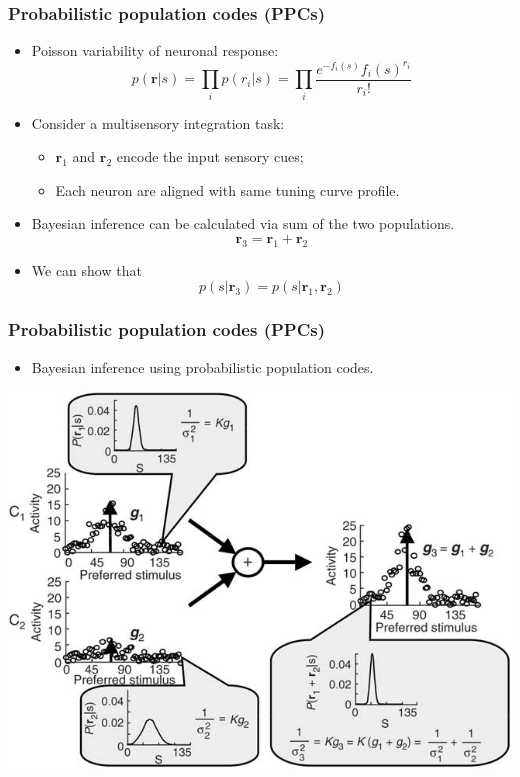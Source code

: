 \documentclass{beamer}
\begin{document}
\begin{frame}
  \frametitle{Probabilistic population codes (PPCs)}
  \begin{itemize}
    \item Poisson variability of neuronal response:
\begin{equation}
  p(\mathbf{r}|s) = \prod_{i} p(r_i|s) = \prod_{i} \frac{e^{-f_i(s)} f_i(s)^{r_i}}{r_i!}
  \label{eq:popvar}
\end{equation}
    \item Consider a multisensory integration task:
    \begin{itemize}
      \item $\mathbf{r}_1$ and $\mathbf{r}_2$ encode the input sensory cues;
      \item Each neuron are aligned with same tuning curve profile.
    \end{itemize}
    \item Bayesian inference can be calculated via sum of the two populations.
    \begin{equation} \mathbf{r}_3 = \mathbf{r}_1 + \mathbf{r}_2 \end{equation}
    \item We can show that
    \begin{equation} p(s|\mathbf{r}_3) = p(s|\mathbf{r}_1,\mathbf{r}_2) \end{equation}
  \end{itemize}
\end{frame}

\begin{frame}
  \frametitle{Probabilistic population codes (PPCs)}
  \begin{itemize}
    \item Bayesian inference using probabilistic population codes.
  \end{itemize}
  \begin{center}
    \includegraphics[width=.8\textwidth]{infer}
  \end{center}
\end{frame}
\end{document}
